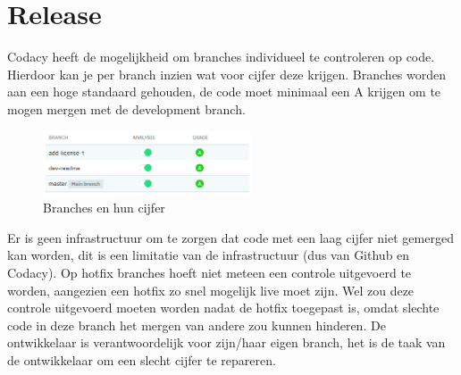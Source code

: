 \section{Release}
Codacy heeft de mogelijkheid om branches individueel te controleren op code.
Hierdoor kan je per branch inzien wat voor cijfer deze krijgen.
Branches worden aan een hoge standaard gehouden, de code moet minimaal een A krijgen om te mogen mergen met de development branch.
\begin{figure}[H]
	\centering\includegraphics[width=0.55\textwidth]{images/CodacyBranchGrades}
	\caption{Branches en hun cijfer}
\end{figure}
Er is geen infrastructuur om te zorgen dat code met een laag cijfer niet gemerged kan worden, dit is een limitatie van de infrastructuur (dus van Github en Codacy).
Op hotfix branches hoeft niet meteen een controle uitgevoerd te worden, aangezien een hotfix zo snel mogelijk live moet zijn.
Wel zou deze controle uitgevoerd moeten worden nadat de hotfix toegepast is, omdat slechte code in deze branch het mergen van andere zou kunnen hinderen.
De ontwikkelaar is verantwoordelijk voor zijn/haar eigen branch, het is de taak van de ontwikkelaar om een slecht cijfer te repareren.
